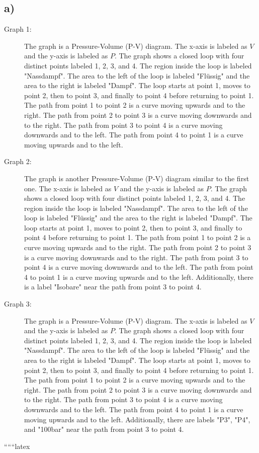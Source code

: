 

\subsection*{a)}

\begin{description}
    \item[Graph 1:] 
    The graph is a Pressure-Volume (P-V) diagram. The x-axis is labeled as $V$ and the y-axis is labeled as $P$. The graph shows a closed loop with four distinct points labeled 1, 2, 3, and 4. The region inside the loop is labeled "Nassdampf". The area to the left of the loop is labeled "Flüssig" and the area to the right is labeled "Dampf". The loop starts at point 1, moves to point 2, then to point 3, and finally to point 4 before returning to point 1. The path from point 1 to point 2 is a curve moving upwards and to the right. The path from point 2 to point 3 is a curve moving downwards and to the right. The path from point 3 to point 4 is a curve moving downwards and to the left. The path from point 4 to point 1 is a curve moving upwards and to the left.
    
    \item[Graph 2:] 
    The graph is another Pressure-Volume (P-V) diagram similar to the first one. The x-axis is labeled as $V$ and the y-axis is labeled as $P$. The graph shows a closed loop with four distinct points labeled 1, 2, 3, and 4. The region inside the loop is labeled "Nassdampf". The area to the left of the loop is labeled "Flüssig" and the area to the right is labeled "Dampf". The loop starts at point 1, moves to point 2, then to point 3, and finally to point 4 before returning to point 1. The path from point 1 to point 2 is a curve moving upwards and to the right. The path from point 2 to point 3 is a curve moving downwards and to the right. The path from point 3 to point 4 is a curve moving downwards and to the left. The path from point 4 to point 1 is a curve moving upwards and to the left. Additionally, there is a label "Isobare" near the path from point 3 to point 4.
    
    \item[Graph 3:] 
    The graph is a Pressure-Volume (P-V) diagram. The x-axis is labeled as $V$ and the y-axis is labeled as $P$. The graph shows a closed loop with four distinct points labeled 1, 2, 3, and 4. The region inside the loop is labeled "Nassdampf". The area to the left of the loop is labeled "Flüssig" and the area to the right is labeled "Dampf". The loop starts at point 1, moves to point 2, then to point 3, and finally to point 4 before returning to point 1. The path from point 1 to point 2 is a curve moving upwards and to the right. The path from point 2 to point 3 is a curve moving downwards and to the right. The path from point 3 to point 4 is a curve moving downwards and to the left. The path from point 4 to point 1 is a curve moving upwards and to the left. Additionally, there are labels "P3", "P4", and "100bar" near the path from point 3 to point 4.
\end{description}

``````latex